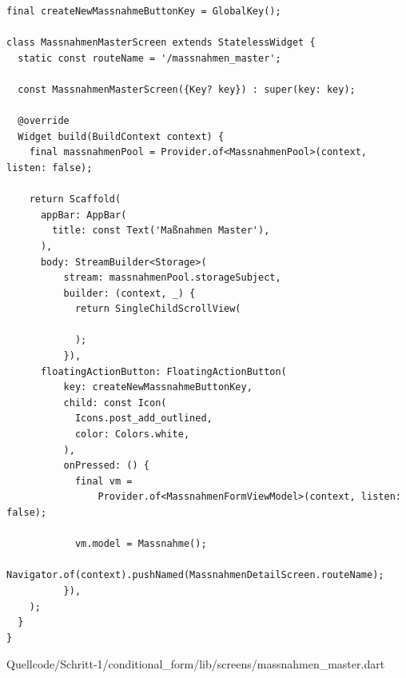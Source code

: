 \begin{listing}[htbp]
  \renewcommand\theFancyVerbLine{%
    \ifnum\value{FancyVerbLine}=32
    \setcounter{FancyVerbLine}{94}
    \tiny\ldots
    \else
    \tiny\arabic{FancyVerbLine}%
    \fi
  }
  \begin{verbatim}
final createNewMassnahmeButtonKey = GlobalKey();

class MassnahmenMasterScreen extends StatelessWidget {
  static const routeName = '/massnahmen_master';

  const MassnahmenMasterScreen({Key? key}) : super(key: key);

  @override
  Widget build(BuildContext context) {
    final massnahmenPool = Provider.of<MassnahmenPool>(context, listen: false);

    return Scaffold(
      appBar: AppBar(
        title: const Text('Maßnahmen Master'),
      ),
      body: StreamBuilder<Storage>(
          stream: massnahmenPool.storageSubject,
          builder: (context, _) {
            return SingleChildScrollView(
              
            );
          }),
      floatingActionButton: FloatingActionButton(
          key: createNewMassnahmeButtonKey,
          child: const Icon(
            Icons.post_add_outlined,
            color: Colors.white,
          ),
          onPressed: () {
            final vm =
                Provider.of<MassnahmenFormViewModel>(context, listen: false);

            vm.model = Massnahme();
            Navigator.of(context).pushNamed(MassnahmenDetailScreen.routeName);
          }),
    );
  }
}

\end{verbatim}
   {Quellcode/Schritt-1/conditional_form/lib/screens/massnahmen_master.dart}
  \label{lst:Schritt1KlasseMassnahmenMasterScreenStruktur}
\end{listing}



